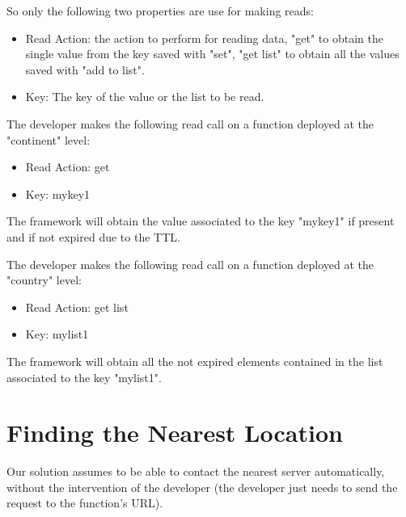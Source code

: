 So only the following two properties are use for making reads:
\begin{itemize}
    \item Read Action: the action to perform for reading data, "get" to obtain the single value from the key saved with "set", "get list" to obtain all the values saved with "add to list".
    \item Key: The key of the value or the list to be read.
\end{itemize}

\begin{example}
The developer makes the following read call on a function deployed at the "continent" level:
\begin{itemize}
    \item Read Action: get
    \item Key: mykey1
\end{itemize}
The framework will obtain the value associated to the key "mykey1" if present and if not expired due to the TTL.
\end{example}

\begin{example}
The developer makes the following read call on a function deployed at the "country" level:
\begin{itemize}
    \item Read Action: get list
    \item Key: mylist1
\end{itemize}
The framework will obtain all the not expired elements contained in the list associated to the key "mylist1".
\end{example}


\section{Finding the Nearest Location}
Our solution assumes to be able to contact the nearest server automatically, without the intervention of the developer (the developer just needs to send the request to the function's URL).

